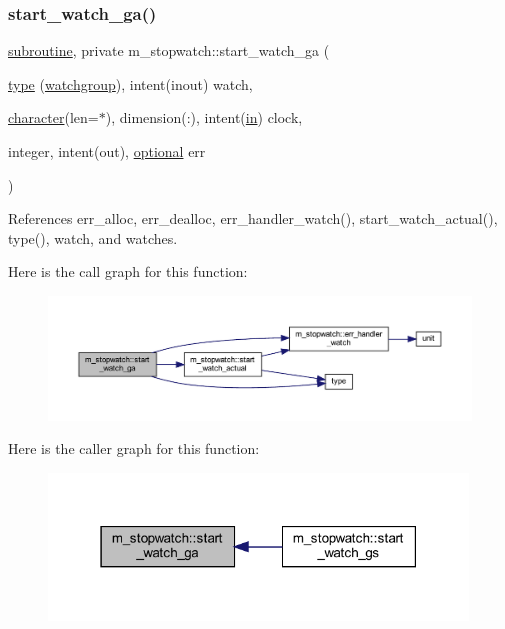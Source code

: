 \subsubsection{\texorpdfstring{start\+\_\+watch\+\_\+ga()}{start\_watch\_ga()}}
{\footnotesize\ttfamily \hyperlink{M__stopwatch_83_8txt_acfbcff50169d691ff02d4a123ed70482}{subroutine}, private m\+\_\+stopwatch\+::start\+\_\+watch\+\_\+ga (\begin{DoxyParamCaption}\item[{\hyperlink{stop__watch_83_8txt_a70f0ead91c32e25323c03265aa302c1c}{type} (\hyperlink{structm__stopwatch_1_1watchgroup}{watchgroup}), intent(inout)}]{watch,  }\item[{\hyperlink{option__stopwatch_83_8txt_abd4b21fbbd175834027b5224bfe97e66}{character}(len=$\ast$), dimension(\+:), intent(\hyperlink{M__journal_83_8txt_afce72651d1eed785a2132bee863b2f38}{in})}]{clock,  }\item[{integer, intent(out), \hyperlink{option__stopwatch_83_8txt_aa4ece75e7acf58a4843f70fe18c3ade5}{optional}}]{err }\end{DoxyParamCaption})\hspace{0.3cm}{\ttfamily [private]}}



References err\+\_\+alloc, err\+\_\+dealloc, err\+\_\+handler\+\_\+watch(), start\+\_\+watch\+\_\+actual(), type(), watch, and watches.

Here is the call graph for this function\+:
\nopagebreak
\begin{figure}[H]
\begin{center}
\leavevmode
\includegraphics[width=350pt]{namespacem__stopwatch_a376a3381824a3edde6f1c96663035c58_cgraph}
\end{center}
\end{figure}
Here is the caller graph for this function\+:
\nopagebreak
\begin{figure}[H]
\begin{center}
\leavevmode
\includegraphics[width=316pt]{namespacem__stopwatch_a376a3381824a3edde6f1c96663035c58_icgraph}
\end{center}
\end{figure}
\mbox{\label{namespacem__stopwatch_a7c2f2f99682a7309aa136e7129bd3591}} 
